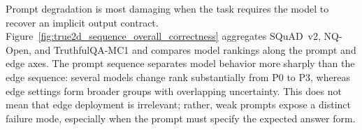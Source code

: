 \documentclass[letterpaper]{article} %
\begin{document}
Prompt degradation is most damaging when the task requires the model to recover an implicit output contract. Figure~\ref{fig:true2d_sequence_overall_correctness} aggregates SQuAD~v2, NQ-Open, and TruthfulQA-MC1 and compares model rankings along the prompt and edge axes. The prompt sequence separates model behavior more sharply than the edge sequence: several models change rank substantially from P0 to P3, whereas edge settings form broader groups with overlapping uncertainty. This does not mean that edge deployment is irrelevant; rather, weak prompts expose a distinct failure mode, especially when the prompt must specify the expected answer form.


\begin{table}[t]
\centering
\small
\setlength{\tabcolsep}{2.2pt}
\renewcommand{\arraystretch}{0.92}


\end{table}
\end{document}
